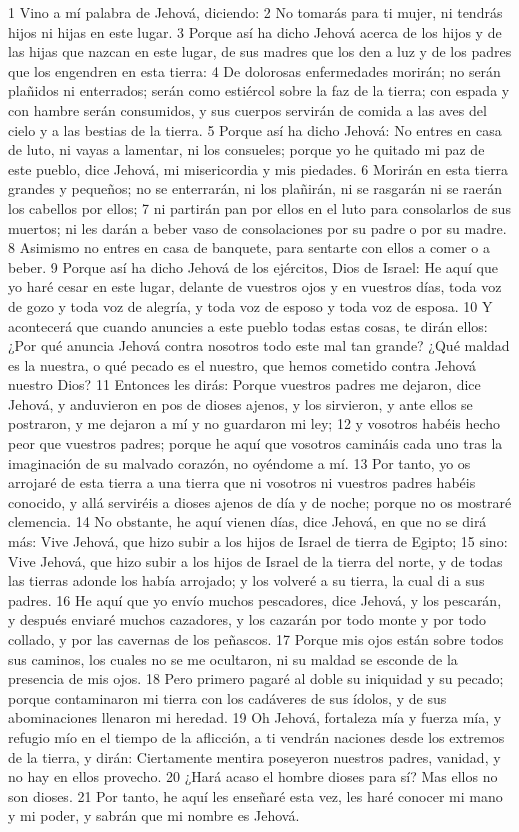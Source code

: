 1 Vino a mí palabra de Jehová, diciendo:
2 No tomarás para ti mujer, ni tendrás hijos ni hijas en este lugar.
3 Porque así ha dicho Jehová acerca de los hijos y de las hijas que nazcan en este lugar, de sus madres que los den a luz y de los padres que los engendren en esta tierra:
4 De dolorosas enfermedades morirán; no serán plañidos ni enterrados; serán como estiércol sobre la faz de la tierra; con espada y con hambre serán consumidos, y sus cuerpos servirán de comida a las aves del cielo y a las bestias de la tierra.
5 Porque así ha dicho Jehová: No entres en casa de luto, ni vayas a lamentar, ni los consueles; porque yo he quitado mi paz de este pueblo, dice Jehová, mi misericordia y mis piedades.
6 Morirán en esta tierra grandes y pequeños; no se enterrarán, ni los plañirán, ni se rasgarán ni se raerán los cabellos por ellos;
7 ni partirán pan por ellos en el luto para consolarlos de sus muertos; ni les darán a beber vaso de consolaciones por su padre o por su madre.
8 Asimismo no entres en casa de banquete, para sentarte con ellos a comer o a beber.
9 Porque así ha dicho Jehová de los ejércitos, Dios de Israel: He aquí que yo haré cesar en este lugar, delante de vuestros ojos y en vuestros días, toda voz de gozo y toda voz de alegría, y toda voz de esposo y toda voz de esposa.
10 Y acontecerá que cuando anuncies a este pueblo todas estas cosas, te dirán ellos: ¿Por qué anuncia Jehová contra nosotros todo este mal tan grande? ¿Qué maldad es la nuestra, o qué pecado es el nuestro, que hemos cometido contra Jehová nuestro Dios?
11 Entonces les dirás: Porque vuestros padres me dejaron, dice Jehová, y anduvieron en pos de dioses ajenos, y los sirvieron, y ante ellos se postraron, y me dejaron a mí y no guardaron mi ley;
12 y vosotros habéis hecho peor que vuestros padres; porque he aquí que vosotros camináis cada uno tras la imaginación de su malvado corazón, no oyéndome a mí.
13 Por tanto, yo os arrojaré de esta tierra a una tierra que ni vosotros ni vuestros padres habéis conocido, y allá serviréis a dioses ajenos de día y de noche; porque no os mostraré clemencia.
14 No obstante, he aquí vienen días, dice Jehová, en que no se dirá más: Vive Jehová, que hizo subir a los hijos de Israel de tierra de Egipto; 
15 sino: Vive Jehová, que hizo subir a los hijos de Israel de la tierra del norte, y de todas las tierras adonde los había arrojado; y los volveré a su tierra, la cual di a sus padres.
16 He aquí que yo envío muchos pescadores, dice Jehová, y los pescarán, y después enviaré muchos cazadores, y los cazarán por todo monte y por todo collado, y por las cavernas de los peñascos.
17 Porque mis ojos están sobre todos sus caminos, los cuales no se me ocultaron, ni su maldad se esconde de la presencia de mis ojos.
18 Pero primero pagaré al doble su iniquidad y su pecado; porque contaminaron mi tierra con los cadáveres de sus ídolos, y de sus abominaciones llenaron mi heredad.
19 Oh Jehová, fortaleza mía y fuerza mía, y refugio mío en el tiempo de la aflicción, a ti vendrán naciones desde los extremos de la tierra, y dirán: Ciertamente mentira poseyeron nuestros padres, vanidad, y no hay en ellos provecho.
20 ¿Hará acaso el hombre dioses para sí? Mas ellos no son dioses.
21 Por tanto, he aquí les enseñaré esta vez, les haré conocer mi mano y mi poder, y sabrán que mi nombre es Jehová.

